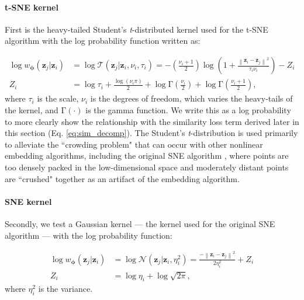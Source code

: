 \documentclass[11pt,a4paper,oneside]{book}
\begin{document}
\begin{doublespace}
\begin{appendices}
\paragraph{t-SNE kernel} First is the heavy-tailed Student's \textit{t}-distributed kernel used for the t-SNE algorithm \citep{maaten2008tsne} with the log probability function written as:

\begin{subequations}
    \begin{align}
    \log w_{\boldsymbol{\phi}}(\mathbf{z}_j | \mathbf{z}_i) &= \log \mathcal{T}(\mathbf{z
    }_j | \mathbf{z}_i, \nu_i, \tau_i) = -\left(\frac{\nu_i + 1}{2}\right)\log \left(1+\frac{\left\|\mathbf{z}_{i} - \mathbf{z}_{j} \right\|^{2}}{\tau_i \nu_i}\right) - Z_i \label{eq:tsne_logp}\\
    Z_i &= \log\tau_i + \frac{\log(\nu_i\pi)}{2} + \log \mathrm{\Gamma}\left(\frac{\nu_i}{2}\right) + \log \mathrm{\Gamma}\left(\frac{\nu_i + 1}{2}\right)\label{eq:tsne_z},
\end{align}
\end{subequations}
where $\tau_i$ is the scale, $\nu_i$ is the degrees of freedom, which varies the heavy-tails of the kernel, and $\mathrm{\Gamma}(\cdot)$ is the gamma function. We write this as a log probability to more clearly show the relationship with the similarity loss term derived later in this section (Eq. \ref{eq:sim_decomp}). The Student's \textit{t}-distribution is used primarily to alleviate the ``crowding problem" \citep{maaten2008tsne} that can occur with other nonlinear embedding algorithms, including the original SNE algorithm \citep{hinton2003stochastic}, where points are too densely packed in the low-dimensional space and moderately distant points are ``crushed" together as an artifact of the embedding algorithm. 

\paragraph{SNE kernel} Secondly, we test a Gaussian kernel --- the kernel used for the original SNE algorithm \citep{hinton2003stochastic, maaten2008tsne} --- with the log probability function:

\begin{subequations}
    \begin{align}
        \log w_{\boldsymbol{\phi}}(\mathbf{z}_j | \mathbf{z}_i) &= \log \mathcal{N}(\mathbf{z}_j | \mathbf{z}_i, \eta_i^{2}) = \frac{-\left\|\mathbf{z}_{i} - \mathbf{z}_{j} \right\|^{2}}{2 \eta_i^{2}} + Z_i \label{eq:sne_logp}\\
        Z_i &= \log\eta_i + \log\sqrt{2 \pi} \label{eq:sne_z},
    \end{align}
\end{subequations}
where $\eta_i^2$ is the variance. 


\end{appendices}
\end{doublespace}
\end{document}
